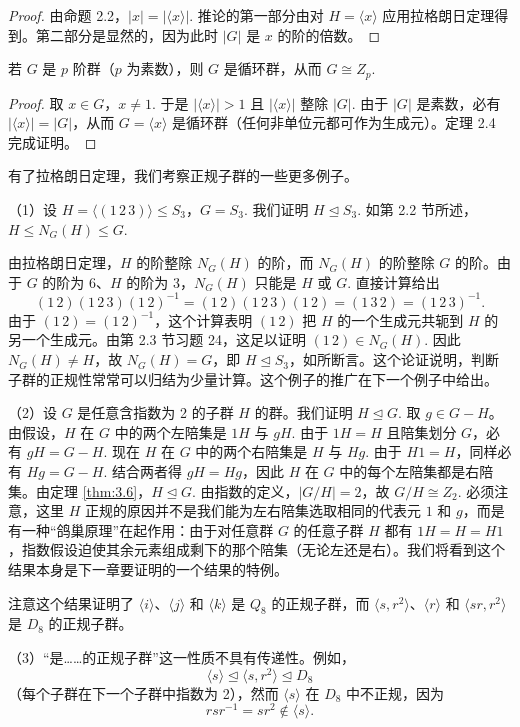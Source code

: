 \begin{proof}
由命题 2.2，\(|x| = |\langle x \rangle|\). 推论的第一部分由对 \(H = \langle x \rangle\) 应用拉格朗日定理得到。第二部分是显然的，因为此时 \(|G|\) 是 \(x\) 的阶的倍数。
\end{proof}

\begin{corollary}\label{cor:3.10}
若 \(G\) 是 \(p\) 阶群（\(p\) 为素数），则 \(G\) 是循环群，从而 \(G \cong Z_p\).
\end{corollary}

\begin{proof}
取 \(x \in G\)，\(x \neq 1\). 于是 \(|\langle x \rangle| > 1\) 且 \(|\langle x \rangle|\) 整除 \(|G|\). 由于 \(|G|\) 是素数，必有 \(|\langle x \rangle| = |G|\)，从而 \(G = \langle x \rangle\) 是循环群（任何非单位元都可作为生成元）。定理 2.4 完成证明。
\end{proof}

有了拉格朗日定理，我们考察正规子群的一些更多例子。

\begin{example}
（1）设 \(H = \langle (1\,2\,3) \rangle \leq S_3\)，\(G = S_3\). 我们证明 \(H \trianglelefteq S_3\). 如第 2.2 节所述，\(H \leq N_G(H) \leq G\).

由拉格朗日定理，\(H\) 的阶整除 \(N_G(H)\) 的阶，而 \(N_G(H)\) 的阶整除 \(G\) 的阶。由于 \(G\) 的阶为 6、\(H\) 的阶为 3，\(N_G(H)\) 只能是 \(H\) 或 \(G\). 直接计算给出
\[
(1\,2)(1\,2\,3)(1\,2)^{-1} = (1\,2)(1\,2\,3)(1\,2) = (1\,3\,2) = (1\,2\,3)^{-1}.
\]
由于 \((1\,2) = (1\,2)^{-1}\)，这个计算表明 \((1\,2)\) 把 \(H\) 的一个生成元共轭到 \(H\) 的另一个生成元。由第 2.3 节习题 24，这足以证明 \((1\,2) \in N_G(H)\). 因此 \(N_G(H) \neq H\)，故 \(N_G(H) = G\)，即 \(H \trianglelefteq S_3\)，如所断言。这个论证说明，判断子群的正规性常常可以归结为少量计算。这个例子的推广在下一个例子中给出。

（2）设 \(G\) 是任意含指数为 2 的子群 \(H\) 的群。我们证明 \(H \trianglelefteq G\). 取 \(g \in G - H\)。由假设，\(H\) 在 \(G\) 中的两个左陪集是 \(1H\) 与 \(gH\). 由于 \(1H = H\) 且陪集划分 \(G\)，必有 \(gH = G - H\). 现在 \(H\) 在 \(G\) 中的两个右陪集是 \(H\) 与 \(Hg\). 由于 \(H1 = H\)，同样必有 \(Hg = G - H\). 结合两者得 \(gH = Hg\)，因此 \(H\) 在 \(G\) 中的每个左陪集都是右陪集。由定理 \ref{thm:3.6}，\(H \trianglelefteq G\). 由指数的定义，\(|G/H| = 2\)，故 \(G/H \cong Z_2\). 必须注意，这里 \(H\) 正规的原因并不是我们能为左右陪集选取相同的代表元 \(1\) 和 \(g\)，而是有一种“鸽巢原理”在起作用：由于对任意群 \(G\) 的任意子群 \(H\) 都有 \(1H = H = H1\)，指数假设迫使其余元素组成剩下的那个陪集（无论左还是右）。我们将看到这个结果本身是下一章要证明的一个结果的特例。

注意这个结果证明了 \(\langle i \rangle\)、\(\langle j \rangle\) 和 \(\langle k \rangle\) 是 \(Q_8\) 的正规子群，而 \(\langle s, r^2 \rangle\)、\(\langle r \rangle\) 和 \(\langle sr, r^2 \rangle\) 是 \(D_8\) 的正规子群。

（3）“是……的正规子群”这一性质不具有传递性。例如，
\[
\langle s \rangle \trianglelefteq \langle s, r^2 \rangle \trianglelefteq D_8
\]
（每个子群在下一个子群中指数为 2），然而 \(\langle s \rangle\) 在 \(D_8\) 中不正规，因为
\[
rsr^{-1} = sr^2 \notin \langle s \rangle.
\]
\end{example}

